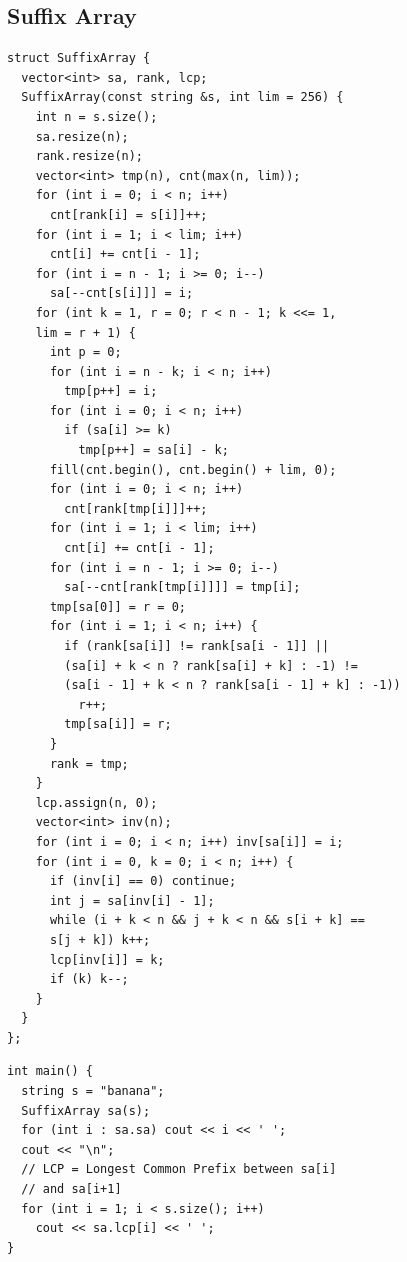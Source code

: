 \subsection{Suffix Array}
\begin{verbatim}
struct SuffixArray {
  vector<int> sa, rank, lcp;
  SuffixArray(const string &s, int lim = 256) {
    int n = s.size();
    sa.resize(n);
    rank.resize(n);
    vector<int> tmp(n), cnt(max(n, lim));
    for (int i = 0; i < n; i++)
      cnt[rank[i] = s[i]]++;
    for (int i = 1; i < lim; i++)
      cnt[i] += cnt[i - 1];
    for (int i = n - 1; i >= 0; i--)
      sa[--cnt[s[i]]] = i;
    for (int k = 1, r = 0; r < n - 1; k <<= 1,
    lim = r + 1) {
      int p = 0;
      for (int i = n - k; i < n; i++)
        tmp[p++] = i;
      for (int i = 0; i < n; i++)
        if (sa[i] >= k)
          tmp[p++] = sa[i] - k;
      fill(cnt.begin(), cnt.begin() + lim, 0);
      for (int i = 0; i < n; i++)
        cnt[rank[tmp[i]]]++;
      for (int i = 1; i < lim; i++)
        cnt[i] += cnt[i - 1];
      for (int i = n - 1; i >= 0; i--)
        sa[--cnt[rank[tmp[i]]]] = tmp[i];
      tmp[sa[0]] = r = 0;
      for (int i = 1; i < n; i++) {
        if (rank[sa[i]] != rank[sa[i - 1]] ||
        (sa[i] + k < n ? rank[sa[i] + k] : -1) !=
        (sa[i - 1] + k < n ? rank[sa[i - 1] + k] : -1))
          r++;
        tmp[sa[i]] = r;
      }
      rank = tmp;
    }
    lcp.assign(n, 0);
    vector<int> inv(n);
    for (int i = 0; i < n; i++) inv[sa[i]] = i;
    for (int i = 0, k = 0; i < n; i++) {
      if (inv[i] == 0) continue;
      int j = sa[inv[i] - 1];
      while (i + k < n && j + k < n && s[i + k] ==
      s[j + k]) k++;
      lcp[inv[i]] = k;
      if (k) k--;
    }
  }
};
\end{verbatim}
\begin{verbatim}
int main() {
  string s = "banana";
  SuffixArray sa(s);
  for (int i : sa.sa) cout << i << ' ';
  cout << "\n";
  // LCP = Longest Common Prefix between sa[i]
  // and sa[i+1]
  for (int i = 1; i < s.size(); i++)
    cout << sa.lcp[i] << ' ';
}
\end{verbatim}
